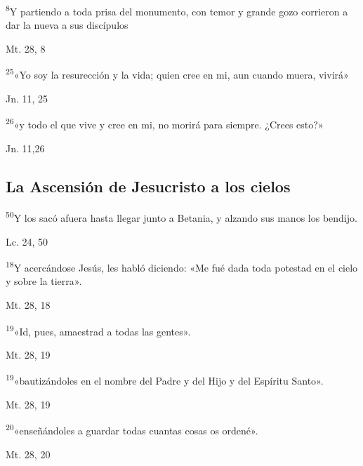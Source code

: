 \documentclass[a4paper,11pt]{article}
\begin{document}
      \textsuperscript{8}Y partiendo a toda prisa del monumento, con temor y grande gozo corrieron a dar la nueva a sus discípulos
      \begin{flushright}
        Mt. 28, 8       
      \end{flushright}

      \textsuperscript{25}«Yo soy la resurección y la vida; quien cree en mi, aun cuando muera, vivirá»
      \begin{flushright}
        Jn. 11, 25    
      \end{flushright}

      \textsuperscript{26}«y todo el que vive y cree en mi, no morirá para siempre. ¿Crees esto?»
      \begin{flushright}
        Jn. 11,26     
      \end{flushright}
    \subsection*{\hfil La Ascensión de Jesucristo a los cielos \hfil}
      
      \textsuperscript{50}Y los sacó afuera hasta llegar junto a Betania, y alzando sus manos los bendijo.
      \begin{flushright}
        Lc. 24, 50     
      \end{flushright}

      \textsuperscript{18}Y acercándose Jesús, les habló diciendo: «Me fué dada toda potestad en el cielo y sobre la tierra».
      \begin{flushright}
        Mt. 28, 18      
      \end{flushright}

      \textsuperscript{19}«Id, pues, amaestrad a todas las gentes».
      \begin{flushright}
        Mt. 28, 19
      \end{flushright}

      \textsuperscript{19}«bautizándoles en el nombre del Padre y del Hijo y del Espíritu Santo».
      \begin{flushright}
        Mt. 28, 19      
      \end{flushright}

      \textsuperscript{20}«enseñándoles a guardar todas cuantas cosas os ordené».
      \begin{flushright}
        Mt. 28, 20  
      \end{flushright}
\end{document}

